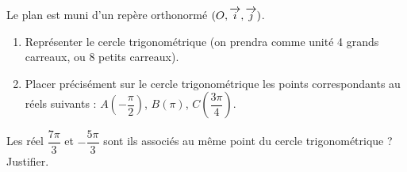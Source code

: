 \documentclass[a4paper,11pt,DIV15,BCOR0mm]{scrartcl}
\begin{document}
\newcommand{\vv}[1]{\vect{#1}}

Le plan est muni d'un repère orthonormé  $(O,\overrightarrow{i},\overrightarrow{j})$.

\begin{exercice}
\begin{enumerate}
 \item Représenter le cercle trigonométrique (on prendra comme unité 4 grands carreaux, ou 8 petits carreaux).
 \item Placer précisément sur le cercle trigonométrique les points correspondants au réels suivants : $A\left(-\dfrac{\pi}{2}\right)$, $B\left(\pi\right)$, $C\left(\dfrac{3\pi}{4}\right)$.
\end{enumerate}

\end{exercice}


\begin{exercice}
Les réel $\dfrac{7\pi}{3}$ et $-\dfrac{5\pi}{3}$ sont ils associés au même point du cercle trigonométrique ? Justifier. 
\end{exercice}
\end{document}
